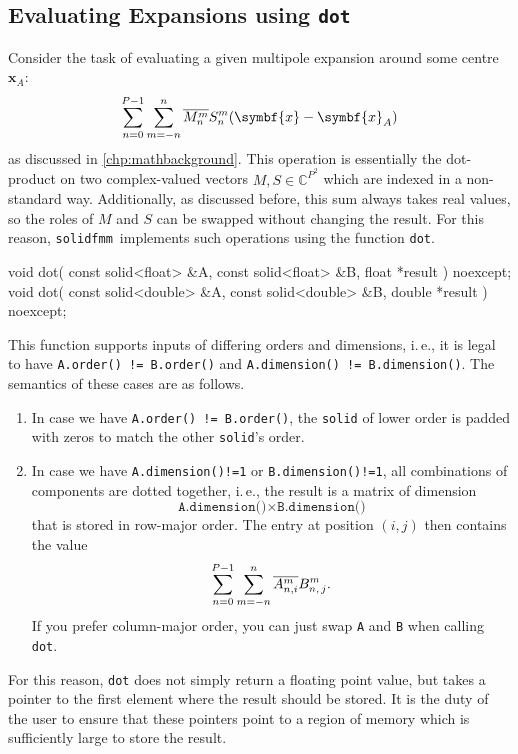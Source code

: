 \documentclass{scrbook}
\newcommand{\solidfmm}{\texttt{solidfmm}}
\newcommand{\vv}[1]{\ensuremath{\symbf{#1}}} %
\begin{document}
\subsection{Evaluating Expansions using \texttt{dot}}
Consider the task of evaluating a given multipole expansion around some centre
$\vv{x}_A$:
\begin{equation}
\sum_{n=0}^{P-1}\sum_{m=-n\vphantom{0}}^n\overline{M_n^m}S_n^m(\vv{x}-\vv{x}_A)
\end{equation}
as discussed in \cref{chp:mathbackground}. This operation is essentially the
dot-product on two complex-valued vectors $M,S\in\mathbb{C}^{P^2}$ which are
indexed in a non-standard way. Additionally, as discussed before, this sum
always takes real values, so the roles of $M$ and $S$ can be swapped without
changing the result. For this reason, \solidfmm\ implements such
operations using the function \lstinline|dot|.
\begin{cppcode*}
void dot( const solid<float>  &A, const solid<float>  &B, float  *result ) noexcept;
void dot( const solid<double> &A, const solid<double> &B, double *result ) noexcept;
\end{cppcode*}

This function supports inputs of differing orders and dimensions, i.\,e.,
it is legal to have \lstinline|A.order() != B.order()| and
\lstinline|A.dimension() != B.dimension()|. The semantics of these cases are
as follows.

\begin{enumerate}
\item In case we have \lstinline|A.order() != B.order()|, the \lstinline|solid|
of lower order is padded with zeros to match the other \lstinline|solid|'s
order.
\item In case we have \lstinline|A.dimension()!=1| or
\lstinline|B.dimension()!=1|, all combinations of components are dotted
together, i.\,e., the result is a matrix of dimension
\begin{equation*}
\texttt{A.dimension()} \times \texttt{B.dimension()}
\end{equation*}
that is stored in row-major order. The entry at position $(i,j)$ then contains
the value
\begin{equation*}
\sum_{n=0}^{P-1}\sum_{m=-n\vphantom{0}}^n\overline{A_{n,i}^m}B_{n,\,j}^m.
\end{equation*}
If you prefer column-major order, you can just swap \lstinline|A| and
\lstinline|B| when calling \lstinline|dot|.
\end{enumerate}
For this reason, \lstinline|dot| does not simply return a floating point value,
but takes a pointer to the first element where the result should be stored. It
is the duty of the user to ensure that these pointers point to a region of
memory which is sufficiently large to store the result.
\end{document}
